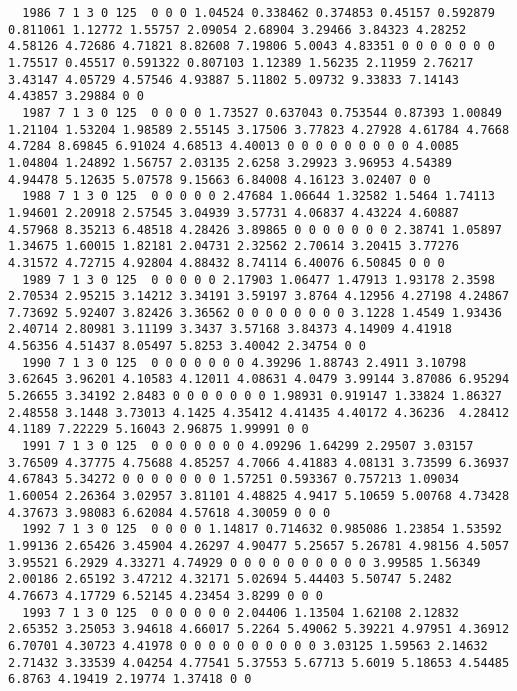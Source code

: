 \begin{landscape}
{\begin{verbatim}
  1986 7 1 3 0 125  0 0 0 1.04524 0.338462 0.374853 0.45157 0.592879 0.811061 1.12772 1.55757 2.09054 2.68904 3.29466 3.84323 4.28252 4.58126 4.72686 4.71821 8.82608 7.19806 5.0043 4.83351 0 0 0 0 0 0 0 1.75517 0.45517 0.591322 0.807103 1.12389 1.56235 2.11959 2.76217   3.43147 4.05729 4.57546 4.93887 5.11802 5.09732 9.33833 7.14143 4.43857 3.29884 0 0
  1987 7 1 3 0 125  0 0 0 0 1.73527 0.637043 0.753544 0.87393 1.00849 1.21104 1.53204 1.98589 2.55145 3.17506 3.77823 4.27928 4.61784 4.7668 4.7284 8.69845 6.91024 4.68513 4.40013 0 0 0 0 0 0 0 0 0 4.0085 1.04804 1.24892 1.56757 2.03135 2.6258 3.29923 3.96953 4.54389  4.94478 5.12635 5.07578 9.15663 6.84008 4.16123 3.02407 0 0
  1988 7 1 3 0 125  0 0 0 0 0 2.47684 1.06644 1.32582 1.5464 1.74113 1.94601 2.20918 2.57545 3.04939 3.57731 4.06837 4.43224 4.60887 4.57968 8.35213 6.48518 4.28426 3.89865 0 0 0 0 0 0 0 2.38741 1.05897 1.34675 1.60015 1.82181 2.04731 2.32562 2.70614 3.20415 3.77276   4.31572 4.72715 4.92804 4.88432 8.74114 6.40076 6.50845 0 0 0
  1989 7 1 3 0 125  0 0 0 0 0 2.17903 1.06477 1.47913 1.93178 2.3598 2.70534 2.95215 3.14212 3.34191 3.59197 3.8764 4.12956 4.27198 4.24867 7.73692 5.92407 3.82426 3.36562 0 0 0 0 0 0 0 0 3.1228 1.4549 1.93436 2.40714 2.80981 3.11199 3.3437 3.57168 3.84373 4.14909 4.41918   4.56356 4.51437 8.05497 5.8253 3.40042 2.34754 0 0
  1990 7 1 3 0 125  0 0 0 0 0 0 0 4.39296 1.88743 2.4911 3.10798 3.62645 3.96201 4.10583 4.12011 4.08631 4.0479 3.99144 3.87086 6.95294 5.26655 3.34192 2.8483 0 0 0 0 0 0 0 1.98931 0.919147 1.33824 1.86327 2.48558 3.1448 3.73013 4.1425 4.35412 4.41435 4.40172 4.36236  4.28412 4.1189 7.22229 5.16043 2.96875 1.99991 0 0
  1991 7 1 3 0 125  0 0 0 0 0 0 0 4.09296 1.64299 2.29507 3.03157 3.76509 4.37775 4.75688 4.85257 4.7066 4.41883 4.08131 3.73599 6.36937 4.67843 5.34272 0 0 0 0 0 0 0 1.57251 0.593367 0.757213 1.09034 1.60054 2.26364 3.02957 3.81101 4.48825 4.9417 5.10659 5.00768 4.73428  4.37673 3.98083 6.62084 4.57618 4.30059 0 0 0
  1992 7 1 3 0 125  0 0 0 0 1.14817 0.714632 0.985086 1.23854 1.53592 1.99136 2.65426 3.45904 4.26297 4.90477 5.25657 5.26781 4.98156 4.5057 3.95521 6.2929 4.33271 4.74929 0 0 0 0 0 0 0 0 0 0 3.99585 1.56349 2.00186 2.65192 3.47212 4.32171 5.02694 5.44403 5.50747 5.2482   4.76673 4.17729 6.52145 4.23454 3.8299 0 0 0
  1993 7 1 3 0 125  0 0 0 0 0 0 2.04406 1.13504 1.62108 2.12832 2.65352 3.25053 3.94618 4.66017 5.2264 5.49062 5.39221 4.97951 4.36912 6.70701 4.30723 4.41978 0 0 0 0 0 0 0 0 0 0 3.03125 1.59563 2.14632 2.71432 3.33539 4.04254 4.77541 5.37553 5.67713 5.6019 5.18653 4.54485  6.8763 4.19419 2.19774 1.37418 0 0

\end{verbatim}}
\end{landscape}
